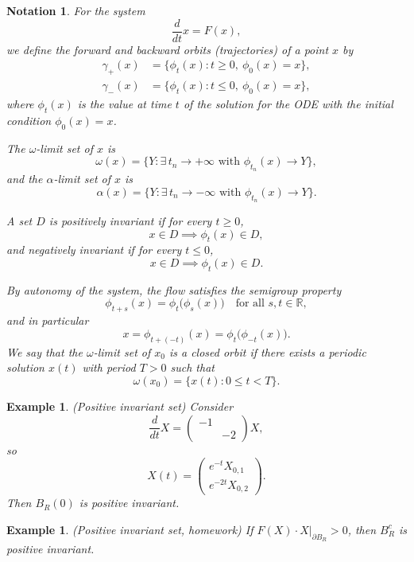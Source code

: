 \documentclass{tufte-handout}
\newcommand*\R{\mathbb{R}}
\newtheorem{ex}[thm]{Example}
\newtheorem{notation}[thm]{Notation}
\theoremstyle{definition}
\begin{document}
\begin{notation}
	For the system
	\[
		\frac{d}{dt} x = F(x),
	\]
	we define the \emph{forward} and \emph{backward} orbits (trajectories) of a point $x$ by
	\begin{align*}
		\gamma_+(x) &= \{\phi_t(x) : t \ge 0, \ \phi_0(x) = x\},\\
		\gamma_-(x) &= \{\phi_t(x) : t \le 0, \ \phi_0(x) = x\},
	\end{align*}
	where $\phi_t(x)$ is the value at time $t$ of the solution for the ODE with the initial condition $\phi_0(x) = x$.

	The \emph{$\omega$-limit set} of $x$ is
	\[
		\omega(x) = \bigl\{ Y : \exists\, t_n \to +\infty \text{ with } \phi_{t_n}(x) \to Y \bigr\},
	\]
	and the \emph{$\alpha$-limit set} of $x$ is
	\[
		\alpha(x) = \bigl\{ Y : \exists\, t_n \to -\infty \text{ with } \phi_{t_n}(x) \to Y \bigr\}.
	\]

	A set $D$ is \emph{positively invariant} if for every $t \ge 0$,
	\[
		x \in D \implies \phi_t(x) \in D,
	\]
	and \emph{negatively invariant} if for every $t \le 0$,
	\[
		x \in D \implies \phi_t(x) \in D.
	\]

	By autonomy of the system, the flow satisfies the semigroup property
	\[
		\phi_{t+s}(x) = \phi_t\bigl( \phi_s(x) \bigr) \quad \text{for all } s,t \in \R,
	\]
	and in particular
	\[
		x = \phi_{t + (-t)}(x) = \phi_t\bigl( \phi_{-t}(x) \bigr).
	\]
	We say that the $\omega$-limit set of $x_0$ is a closed orbit if there exists a periodic
	solution $x(t)$ with period $T > 0$ such that
	\[
	  \omega(x_0) = \{ x(t) : 0 \le t < T \}.
	\]
\end{notation}

\begin{ex}
	(Positive invariant set) Consider \[
		\frac{d}{dt}X = \begin{pmatrix}
		-1 &  \\
		   & -2
		\end{pmatrix} X
	,\] so \[
		X(t) = \begin{pmatrix}
		e^{-t }X_{0,1} \\
		e^{-2t}X_{0,2}
		\end{pmatrix} 
	.\] Then $B_R(0)$ is positive invariant.
\end{ex}

\begin{ex}
	(Positive invariant set, homework) If $F(X) \cdot X\left.\right|_{\partial B_R} > 0$, then $B_R^{c}$ is positive invariant.
\end{ex}
\end{document}
